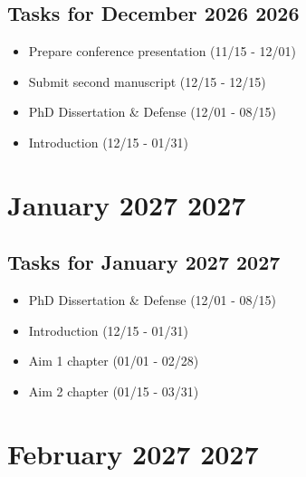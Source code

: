 \documentclass[landscape,a4paper]{article}
\begin{document}
\vspace{1cm}

\subsection*{Tasks for December 2026 2026}
\begin{itemize}
\item Prepare conference presentation (11/15 - 12/01)
\item Submit second manuscript (12/15 - 12/15)
\item PhD Dissertation \& Defense (12/01 - 08/15)
\item Introduction (12/15 - 01/31)
\end{itemize}
\newpage

\section*{January 2027 2027}

\begin{center}
\begin{tikzpicture}[scale=0.9]
\end{tikzpicture}
\end{center}

\vspace{1cm}

\subsection*{Tasks for January 2027 2027}
\begin{itemize}
\item PhD Dissertation \& Defense (12/01 - 08/15)
\item Introduction (12/15 - 01/31)
\item Aim 1 chapter (01/01 - 02/28)
\item Aim 2 chapter (01/15 - 03/31)
\end{itemize}
\newpage

\section*{February 2027 2027}

\begin{center}
\begin{tikzpicture}[scale=0.9]
\end{tikzpicture}
\end{center}
\end{document}
